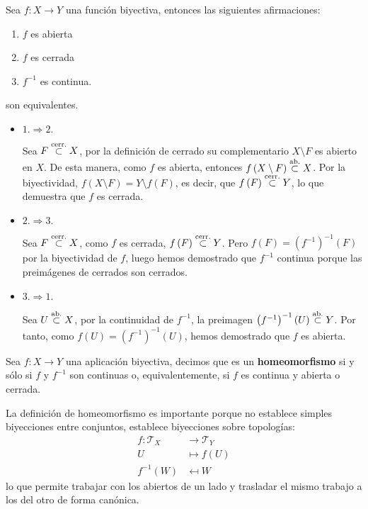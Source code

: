 \begin{prop}
Sea $f:X\rightarrow Y$ una función biyectiva, entonces las siguientes afirmaciones:
\begin{enumerate}
    \item $f$ es abierta
    \item $f$ es cerrada
    \item $f^{-1}$ es continua.
\end{enumerate}
son equivalentes.
\end{prop}
\begin{demo}
\begin{itemize}
    \item $1. \Rightarrow 2.$
    
    Sea $F \stackrel{\text{cerr.}}{\subset} X$, por la definición de cerrado su complementario $X\setminus F$ es abierto en $X$. De esta manera, como $f$ es abierta, entonces $f\left( X\setminus F \right) \stackrel{\text{ab.}}{\subset} X$. Por la biyectividad, $f\left( X\setminus F \right) = Y\setminus f\left( F \right)$, es decir, que $f\left( F \right) \stackrel{\text{cerr.}}{\subset} Y$, lo que demuestra que $f$ es cerrada.

    \item $2. \Rightarrow 3.$
    
    Sea $F \stackrel{\text{cerr.}}{\subset} X$, como $f$ es cerrada, $f\left( F \right) \stackrel{\text{cerr.}}{\subset} Y$. Pero $f(F)= \left( f^{-1} \right)^{-1} \left( F \right)$ por la biyectividad de $f$, luego hemos demostrado que $f^{-1}$ continua porque las preimágenes de cerrados son cerrados.

    \item $3. \Rightarrow 1.$
    
    Sea $U \stackrel{\text{ab.}}{\subset} X$, por la continuidad de $f^{-1}$, la preimagen $\left( f^{-1} \right)^{-1} \left( U \right) \stackrel{\text{ab.}}{\subset} Y$. Por tanto, como $f\left( U \right) =  \left( f^{-1} \right)^{-1} \left( U \right)$, hemos demostrado que $f$ es abierta.
\end{itemize}
\end{demo}

\begin{defi}[Homeomorfismo]
Sea $f: X \rightarrow Y$ una aplicación biyectiva, decimos que es un \textbf{homeomorfismo} si y sólo si $f$ y $f^{-1}$ son continuas o, equivalentemente, si $f$ es continua y abierta o cerrada.
\end{defi}

\begin{obs}
La definición de homeomorfismo es importante porque no establece simples biyecciones entre conjuntos, establece biyecciones sobre topologías:
\begin{align*}
	f: \mathcal{T}_X &\rightarrow \mathcal{T}_Y\\
	U &\mapsto f\left( U \right)\\
	f^{-1}\left( W \right) &\mapsfrom W 
\end{align*}
lo que permite trabajar con los abiertos de un lado y trasladar el mismo trabajo a los del otro de forma canónica.
\end{obs}

